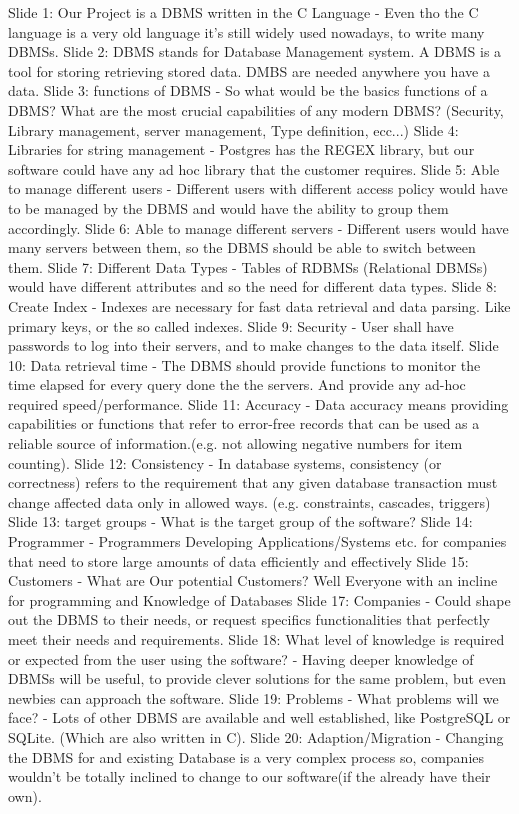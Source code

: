 Slide 1:
	Our Project is a DBMS written in the C Language - Even tho the C language is a very old language it's still widely used nowadays, to write many DBMSs.
Slide 2:
	DBMS stands for Database Management system. A DBMS is a tool for storing retrieving stored data. DMBS are needed anywhere you have a data.
Slide 3:
	functions of DBMS -  So what would be the basics functions of a DBMS? What are the most crucial capabilities of any modern DBMS? (Security, Library management, server management, Type definition, ecc...)
Slide 4:
	Libraries for string management - Postgres has the REGEX library, but our software could have any ad hoc library that the customer requires. 
Slide 5:
	Able to manage different users - Different users with different access policy would have to be managed by the DBMS and would have the ability to group them accordingly.
Slide 6:
	Able to manage different servers - Different users would have many servers between them, so the DBMS should be able to switch between them.
Slide 7:
	Different Data Types - Tables of RDBMSs (Relational DBMSs) would have different attributes and so the need for different data types. %
Slide 8:
	Create Index - Indexes are necessary for fast data retrieval and data parsing. Like primary keys, or the so called indexes. 
Slide 9:
	Security - User shall have passwords to log into their servers, and to make changes to the data itself.
Slide 10:
	 Data retrieval time - The DBMS should provide functions to monitor the time elapsed for every query done the the servers. And provide any ad-hoc required speed/performance. 
Slide 11:
	Accuracy - Data accuracy means providing capabilities or functions that refer to error-free records that can be used as a reliable source of information.(e.g. not allowing negative numbers for item counting).
Slide 12:
	Consistency - In database systems, consistency (or correctness) refers to the requirement that any given database transaction must change affected data only in allowed ways. (e.g. constraints, cascades, triggers)
Slide 13:
	target groups - What is the target group of the software? 
Slide 14: 
	Programmer - Programmers Developing Applications/Systems etc. for companies that need to store large amounts of data efficiently and effectively 
Slide 15:
	Customers - What are Our potential Customers? Well Everyone with an incline for programming and Knowledge of Databases
Slide 17:
	Companies - Could shape out the DBMS to their needs, or request specifics functionalities that perfectly meet their needs and requirements. 
Slide 18:
	What level of knowledge is required or expected from the user using the software? - Having deeper knowledge of DBMSs will be useful, to provide clever solutions for the same problem, but even newbies can approach the software.
Slide 19:
	Problems - What problems will we face? - Lots of other DBMS are available and well established, like PostgreSQL or SQLite. (Which are also written in C).
Slide 20: 
	Adaption/Migration - Changing the DBMS for and existing Database is a very complex process so, companies wouldn't be totally inclined to change to our software(if the already have their own).